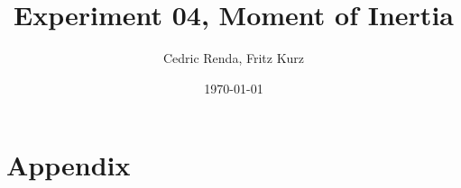 \documentclass[12pt,a4paper]{article}
\title{Experiment 04, Moment of Inertia}
\author{Cedric Renda, Fritz Kurz}
\date{\today }
\begin{document}
\maketitle




\tableofcontents
\newpage


\newpage

\clearpage




\newpage

\section{Appendix}

\end{document}
